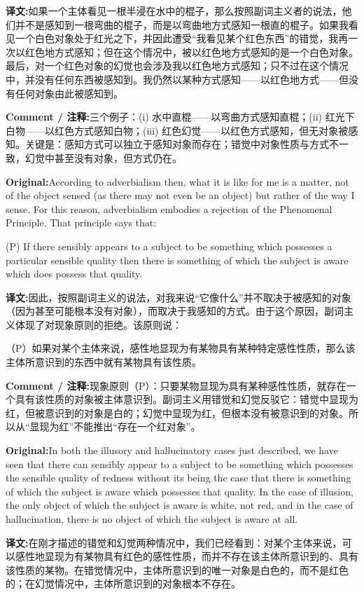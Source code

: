 \documentclass[11pt,a4paper]{article}
\newcommand{\eng}[1]{\begin{engbox}\noindent\textbf{Original:}\quad #1\end{engbox}}
\newcommand{\cn}[1]{\begin{cnbox}\noindent\textbf{译文:}\quad #1\end{cnbox}}
\newcommand{\cmt}[1]{\begin{commentbox}\noindent\textbf{Comment / 注释:}\quad #1\end{commentbox}}
\begin{document}
\cn{如果一个主体看见一根半浸在水中的棍子，那么按照副词主义者的说法，他们并不是感知到一根弯曲的棍子，而是以弯曲地方式感知一根直的棍子。如果我看见一个白色对象处于红光之下，并因此遭受“我看见某个红色东西”的错觉，我再一次以红色地方式感知；但在这个情况中，被以红色地方式感知的是一个白色对象。最后，对一个红色对象的幻觉也会涉及我以红色地方式感知；只不过在这个情况中，并没有任何东西被感知到。我仍然以某种方式感知——以红色地方式——但没有任何对象由此被感知到。}

\cmt{三个例子：(i) 水中直棍——以弯曲方式感知直棍；(ii) 红光下白物——以红色方式感知白物；(iii) 红色幻觉——以红色方式感知，但无对象被感知。关键是：感知方式可以独立于感知对象而存在；错觉中对象性质与方式不一致，幻觉中甚至没有对象，但方式仍在。}

\eng{According to adverbialism then, what it is like for me is a matter, not of the object sensed (as there may not even be an object) but rather of the way I sense. For this reason, adverbialism embodies a rejection of the Phenomenal Principle. That principle says that:

(P) If there sensibly appears to a subject to be something which possesses a particular sensible quality then there is something of which the subject is aware which does possess that quality.}

\cn{因此，按照副词主义的说法，对我来说“它像什么”并不取决于被感知的对象（因为甚至可能根本没有对象），而取决于我感知的方式。由于这个原因，副词主义体现了对现象原则的拒绝。该原则说：

（P）如果对某个主体来说，感性地显现为有某物具有某种特定感性性质，那么该主体所意识到的东西中就有某物具有该性质。}

\cmt{现象原则（P）：只要某物显现为具有某种感性性质，就存在一个具有该性质的对象被主体意识到。副词主义用错觉和幻觉反驳它：错觉中显现为红，但被意识到的对象是白的；幻觉中显现为红，但根本没有被意识到的对象。所以从“显现为红”不能推出“存在一个红对象”。}

\eng{In both the illusory and hallucinatory cases just described, we have seen that there can sensibly appear to a subject to be something which possesses the sensible quality of redness without its being the case that there is something of which the subject is aware which possesses that quality. In the case of illusion, the only object of which the subject is aware is white, not red, and in the case of hallucination, there is no object of which the subject is aware at all.}

\cn{在刚才描述的错觉和幻觉两种情况中，我们已经看到：对某个主体来说，可以感性地显现为有某物具有红色的感性性质，而并不存在该主体所意识到的、具有该性质的某物。在错觉情况中，主体所意识到的唯一对象是白色的，而不是红色的；在幻觉情况中，主体所意识到的对象根本不存在。}
\end{document}
